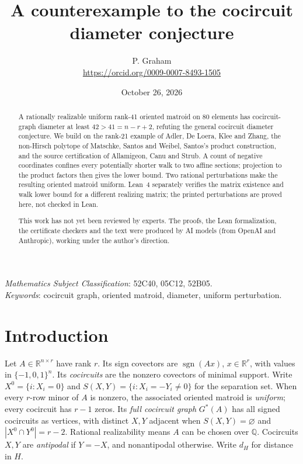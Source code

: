 \documentclass[11pt]{article}
\title{A counterexample to the cocircuit diameter conjecture}
\author{P. Graham\\ \small\url{https://orcid.org/0009-0007-8493-1505}}
\date{October 26, 2026}
\theoremstyle{remark}
\newcommand{\Q}{\mathbb Q}
\newcommand{\R}{\mathbb R}
\newcommand{\sgn}{\operatorname{sgn}}
\begin{document}
\maketitle
\begin{abstract}
A rationally realizable uniform rank-41 oriented matroid on 80 elements
has cocircuit-graph diameter at least $42>41=n-r+2$, refuting the
general cocircuit diameter conjecture. We build on the rank-21 example
of Adler, De Loera, Klee and Zhang, the non-Hirsch polytope of
Matschke, Santos and Weibel, Santos's product construction, and the
source certification of Allamigeon, Canu and Strub. A count of negative
coordinates confines every potentially shorter walk to two affine sections;
projection to the product factors then gives the lower bound.
Two rational perturbations make the resulting oriented matroid uniform.
Lean~4 separately verifies the matrix existence and walk lower bound
for a different realizing matrix; the printed perturbations are proved here,
not checked in Lean.

This work has not yet been reviewed by experts.
The proofs, the Lean formalization, the certificate checkers and the text were produced by AI models
(from OpenAI and Anthropic), working under the author's direction.
\end{abstract}
\medskip

 \emph{Mathematics Subject Classification}: 52C40, 05C12, 52B05.\\
\emph{Keywords}: cocircuit graph, oriented matroid, diameter, uniform perturbation.

\section{Introduction}

Let $A\in\R^{n\times r}$ have rank $r$. Its sign covectors are
$\sgn(Ax)$, $x\in\R^r$, with values in $\{-1,0,1\}^n$.
Its \emph{cocircuits} are the nonzero covectors of minimal support.
Write $X^0=\{i:X_i=0\}$ and
$S(X,Y)=\{i:X_i=-Y_i\ne0\}$ for the separation set. When every $r$-row minor of $A$ is nonzero,
the associated oriented matroid is \emph{uniform}; every cocircuit has
$r-1$ zeros. Its \emph{full cocircuit graph} $G^*(A)$ has all signed cocircuits
as vertices, with distinct $X,Y$ adjacent when
$S(X,Y)=\varnothing$ and $|X^0\cap Y^0|=r-2$.
Rational realizability means $A$ can be chosen over $\Q$.
Cocircuits $X,Y$ are \emph{antipodal} if $Y=-X$, and nonantipodal otherwise.
Write $d_H$ for distance in $H$.
\end{document}

